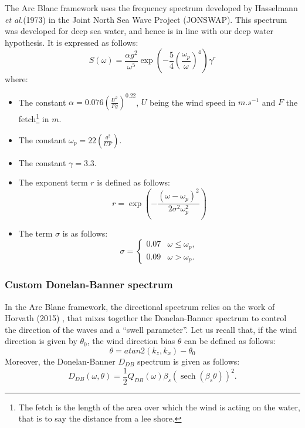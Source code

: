 \documentclass[final]{jcgt}
\def\Framework{The Arc Blanc framework\xspace}
\def\framework{the Arc Blanc framework\xspace}
\def\etal{\emph{et al.}\xspace}
\begin{document}
\Framework uses the frequency spectrum developed by Hasselmann \etal (1973) \cite{k.hasselmannMeasurementsWindwaveGrowth1973} in the Joint North Sea Wave Project (JONSWAP).
This spectrum was developed for deep sea water, and hence is in line with our deep water hypothesis.
It is expressed as follows:
\begin{equation}
	S(\omega)=\frac{\alpha g^2}{\omega^5} \exp\left(-\frac{5}{4}\left(\frac{\omega_p}{\omega}\right)^4\right)\gamma^r
\end{equation}
where:
\begin{itemize}
	\item The constant $\alpha=0.076\left(\frac{U^2}{F g}\right)^{0.22}$, $U$ being the wind speed in $m.s^{-1}$ and $F$ the fetch\footnote{The fetch is the length of the area over which the wind is acting on the water, that is to say the distance from a lee shore.} in $m$.
	\item The constant $\omega_p=22\left(\frac{g^2}{U F}\right)$.
	\item The constant $\gamma=3.3$.
	\item The exponent term $r$ is defined as follows:
	      \begin{equation}
		      r=\exp\left(-\frac{\left(\omega-\omega_p\right)^2}{2 \sigma^2 \omega_p^2}\right)
	      \end{equation}
	\item The term $\sigma$ is as follows:
	      \[
		      \sigma=\begin{cases}
			      0.07 & \omega \leq \omega_p, \\
			      0.09 & \omega>\omega_p.
		      \end{cases}
	      \]
\end{itemize}

\subsubsection{Custom Donelan-Banner spectrum}
\label{subsubsec:donelanbanner}

In \framework, the directional spectrum relies on the work of Horvath (2015) \cite{horvathEmpiricalDirectionalWave2015}, that mixes together the Donelan-Banner spectrum to control the direction of the waves and a “swell parameter”.
Let us recall that, if the wind direction is given by $\theta_0$, the wind direction bias $\theta$ can be defined as follows:
\begin{equation}
	\theta = atan2(k_z, k_x) - \theta_0
\end{equation}
Moreover, the Donelan-Banner $D_{DB}$ spectrum is given as follows:
\begin{equation}
	D_{DB}\left(\omega,\theta\right)=\frac{1}{2}Q_{DB}\left(\omega\right)\beta_s\left(\operatorname{sech}\left(\beta_s\theta\right)\right)^2.
	\label{equa:ddb}
\end{equation}
\end{document}
